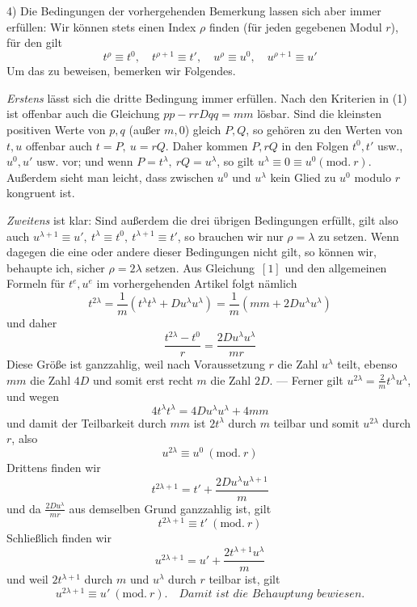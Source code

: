 4) Die Bedingungen der vorhergehenden Bemerkung lassen sich aber immer erfüllen: Wir können stets einen Index \(\rho\) finden (für jeden gegebenen Modul \(r\)), für den gilt
\[
t^\rho\equiv t^0,\quad t^{\rho+1}\equiv t',\quad u^\rho\equiv u^0,\quad u^{\rho+1}\equiv u'
\]
Um das zu beweisen, bemerken wir Folgendes.

\textit{Erstens} lässt sich die dritte Bedingung immer erfüllen. Nach den Kriterien in (1) ist offenbar auch die Gleichung \(pp-rrDqq=mm\) lösbar. Sind die kleinsten positiven Werte von \(p,q\) (außer \(m,0\)) gleich \(P,Q\), so gehören zu den Werten von \(t,u\) offenbar auch \(t=P,\ u=rQ\). Daher kommen \(P,rQ\) in den Folgen \(t^0,t'\) usw., \(u^0,u'\) usw. vor; und wenn \(P=t^\lambda,\ rQ=u^\lambda\), so gilt \(u^\lambda\equiv0\equiv u^0(\mathrm{mod.}\ r)\). Außerdem sieht man leicht, dass zwischen \(u^0\) und \(u^\lambda\) kein Glied zu \(u^0\) modulo \(r\) kongruent ist.

\textit{Zweitens} ist klar: Sind außerdem die drei übrigen Bedingungen erfüllt, gilt also auch \(u^{\lambda+1}\equiv u',\ t^\lambda\equiv t^0,\ t^{\lambda+1}\equiv t'\), so brauchen wir nur \(\rho=\lambda\) zu setzen. Wenn
dagegen die eine oder andere dieser Bedingungen nicht gilt, so können wir, behaupte ich, sicher \(\rho=2\lambda\) setzen. Aus Gleichung~\([1]\) und den allgemeinen Formeln für \(t^e,u^e\) im vorhergehenden Artikel folgt nämlich
\[
t^{2\lambda}=\frac1m(t^\lambda t^\lambda+Du^\lambda u^\lambda)=\frac1m(mm+2Du^\lambda u^\lambda)
\]
und daher
\[
\frac{t^{2\lambda}-t^0}{r}=\frac{2Du^\lambda u^\lambda}{mr}
\]
Diese Größe ist ganzzahlig, weil nach Voraussetzung \(r\) die Zahl \(u^\lambda\) teilt, ebenso \(mm\) die Zahl \(4D\) und somit erst recht \(m\) die Zahl \(2D\). --- Ferner gilt \(u^{2\lambda}=\frac2m t^\lambda u^\lambda\), und wegen
\[
4t^\lambda t^\lambda=4Du^\lambda u^\lambda+4mm
\]
und damit der Teilbarkeit durch \(mm\) ist \(2t^\lambda\) durch \(m\) teilbar und somit \(u^{2\lambda}\) durch \(r\), also
\[
u^{2\lambda}\equiv u^0\ (\mathrm{mod.}\ r)
\]
Drittens finden wir
\[
t^{2\lambda+1}=t'+\frac{2Du^\lambda u^{\lambda+1}}{m}
\]
und da \(\frac{2Du^\lambda}{mr}\) aus demselben Grund ganzzahlig ist, gilt
\[
t^{2\lambda+1}\equiv t'\ (\mathrm{mod.}\ r)
\]
Schließlich finden wir
\[
u^{2\lambda+1}=u'+\frac{2t^{\lambda+1}u^\lambda}{m}
\]
und weil \(2t^{\lambda+1}\) durch \(m\) und \(u^\lambda\) durch \(r\) teilbar ist, gilt
\[
u^{2\lambda+1}\equiv u'\ (\mathrm{mod.}\ r).\quad \textit{Damit ist die Behauptung bewiesen.}
\]

